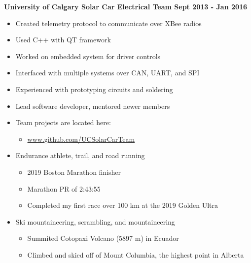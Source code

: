 \documentclass[12pt]{article}
\begin{document}
\bigskip
{}
\medskip

\noindent \centerline{\bf University of Calgary Solar Car Electrical Team \hfill Sept 2013 - Jan 2016}
\begin{itemize}
  \item Created telemetry protocol to communicate over XBee radios
  \item Used C++ with QT framework
  \item Worked on embedded system for driver controls
  \item Interfaced with multiple systems over CAN, UART, and SPI
  \item Experienced with prototyping circuits and soldering
  \item Lead software developer, mentored newer members
  \item Team projects are located here:
\begin{itemize}
  \item \url{www.github.com/UCSolarCarTeam}
\end{itemize}
\end{itemize}

\bigskip
{}
\medskip

\begin{itemize}
\item Endurance athlete, trail, and road running
  \begin{itemize}
    \item 2019 Boston Marathon finisher
    \item Marathon PR of 2:43:55
    \item Completed my first race over 100 km at the 2019 Golden Ultra
  \end{itemize}
\item Ski mountaineering, scrambling, and mountaineering
  \begin{itemize}
    \item Summited Cotopaxi Volcano (5897 m) in Ecuador
    \item Climbed and skied off of Mount Columbia, the highest point in Alberta
  \end{itemize}
\end{itemize}
\end{document}

